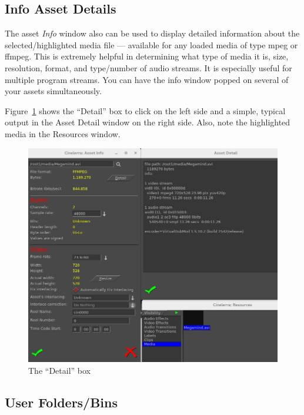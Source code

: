 \subsection{Info Asset Details}%
\label{sub:info_asset_details}

The asset \emph{Info} window also can be used to display detailed information about the selected/highlighted media file --- available for any loaded media of type mpeg or ffmpeg.  
This is extremely helpful in determining what type of media it is, size, resolution, format, and type/number of audio streams.  It is especially useful for multiple program streams.  You can have the info window popped on several of your assets simultaneously.

Figure~\ref{fig:info_asset_details} shows the “Detail” box to click on the left side and a simple, typical output in the Asset Detail window on the right side.  Also, note the highlighted media in the Resources window.

\begin{figure}[htpb]
    \centering
    \includegraphics[width=0.99\linewidth]{images/info_asset_details.png}
    \caption{The “Detail” box}
    \label{fig:info_asset_details}
\end{figure}

\subsection{User Folders/Bins}%
\label{sub:user_folders_bins}

